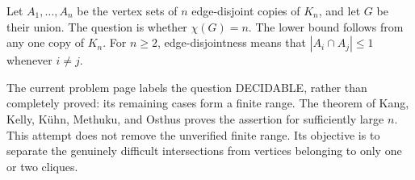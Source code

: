 Let $A_1,\ldots,A_n$ be the vertex sets of $n$ edge-disjoint copies of $K_n$, and let $G$ be their union. The question is whether $\chi(G)=n$. The lower bound follows from any one copy of $K_n$. For $n\ge2$, edge-disjointness means that $|A_i\cap A_j|\le1$ whenever $i\ne j$.

The current problem page labels the question DECIDABLE, rather than completely proved: its remaining cases form a finite range. The theorem of Kang, Kelly, K\"uhn, Methuku, and Osthus proves the assertion for sufficiently large $n$. This attempt does not remove the unverified finite range. Its objective is to separate the genuinely difficult intersections from vertices belonging to only one or two cliques.

